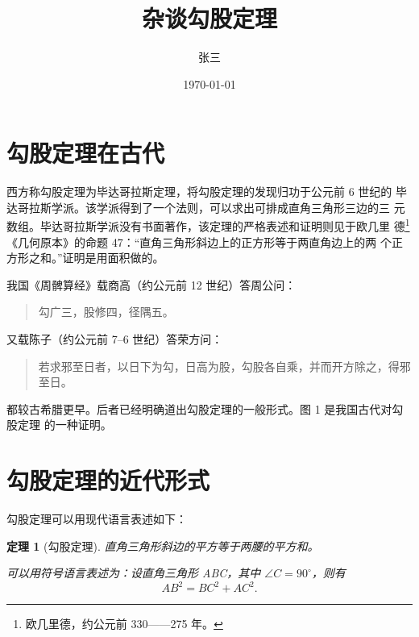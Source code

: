 \documentclass[UTF8]{ctexart}
\title{杂谈勾股定理}
\author{张三}
\date{\today}
\newtheorem{thm}{定理}
\begin{document}
\maketitle
\tableofcontents
\section{勾股定理在古代}
西方称勾股定理为毕达哥拉斯定理，将勾股定理的发现归功于公元前 6 世纪的
毕达哥拉斯学派。该学派得到了一个法则，可以求出可排成直角三角形三边的三
元数组。毕达哥拉斯学派没有书面著作，该定理的严格表述和证明则见于欧几里
德\footnote{欧几里德，约公元前 330——275 年。}《几何原本》的命题 47：“直角三角形斜边上的正方形等于两直角边上的两
个正方形之和。”证明是用面积做的。

我国《周髀算经》载商高（约公元前 12 世纪）答周公问：
\begin{quote}
\kaishu 勾广三，股修四，径隅五。
\end{quote}
又载陈子（约公元前 7--6 世纪）答荣方问：
\begin{quote}
\kaishu 若求邪至日者，以日下为勾，日高为股，勾股各自乘，并而开方除之，得邪至日。
\end{quote}
都较古希腊更早。后者已经明确道出勾股定理的一般形式。图 1 是我国古代对勾股定理
的一种证明。
\section{勾股定理的近代形式}
勾股定理可以用现代语言表述如下：
\begin{thm}[勾股定理]
直角三角形斜边的平方等于两腰的平方和。

可以用符号语言表述为：设直角三角形 ABC，其中 $\angle C = 90^\circ$，则有
\begin{equation}
  AB^2 = BC^2 + AC^2.
\end{equation}
\end{thm}


\end{document}
